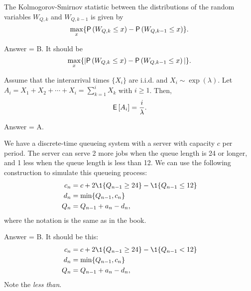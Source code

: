 \begin{exercise}[201803]
The Kolmogorov-Smirnov statistic between the distributions of the random variables $W_{Q,k}$ and $W_{Q,k-1}$ is given by
\begin{equation*}
 \max_x\{ \P{W_{Q,k}\leq x} - \P{W_{Q,k-1}\leq x}\}.
\end{equation*}

\begin{solution}
Answer = B. It should be
\begin{equation*}
 \max_x\{|\P{W_{Q,k}\leq x} - \P{W_{Q,k-1}\leq x}|\}.
\end{equation*}

\end{solution}
\end{exercise}


\begin{exercise}[201804]
 Assume that the interarrival times $\{X_i\}$ are i.i.d. and
 $X_i\sim\exp(\lambda)$. Let
 $A_i=X_1+X_2+\cdots+X_i=\sum_{k=1}^i X_k$ with $i\geq 1$. Then,
 \begin{equation*}
\,\mathsf{E}\left[A_i\right] = \frac i\lambda.
 \end{equation*}
\begin{solution}
Answer = A.
\end{solution}
\end{exercise}

\begin{exercise}[201804]
We have a discrete-time queueing system with a server with capacity $c$ per period. The server can serve 2 more jobs
when the queue length is 24 or longer, and 1 less when the queue length is less than 12. 
We can use the following construction to simulate this queueing process:
\begin{align*}
c_n &= c + 2\1{Q_{n-1} \geq 24} - \1{Q_{n-1} \leq 12}\\
 d_n &= \min\{Q_{n-1}, c_n\} \\
Q_n &= Q_{n-1} + a_n - d_n,
\end{align*}
where the notation is the same as in the book.
\begin{solution}
Answer = B. It should be this:
\begin{align*}
c_n &= c + 2\1{Q_{n-1} \geq 24} - \1{Q_{n-1} < 12}\\
 d_n &= \min\{Q_{n-1}, c_n\} \\
Q_n &= Q_{n-1} + a_n - d_n,
\end{align*}
Note the \emph{less than}.
\end{solution}
\end{exercise}

